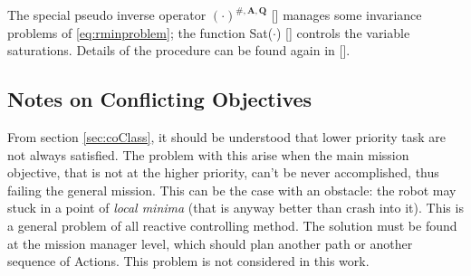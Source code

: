\noindent The special pseudo inverse operator $\boldsymbol{(\cdot)}^{\#,\boldsymbol{A},\boldsymbol{Q}}$ [\cite{IntroMaris1}] manages some invariance problems of \eqref{eq:rminproblem}; the function Sat($\cdot$) [\cite{antoSat}] controls the variable saturations. Details of the procedure can be found again in [\cite{IntroMaris1}].

\subsection{Notes on Conflicting Objectives}
From section \ref{sec:coClass}, it should be understood that lower priority task are not always satisfied. The problem with this arise when the main mission objective, that is not at the higher priority, can't be never accomplished, thus failing the general mission. This can be the case with an obstacle: the robot may stuck in a point of \textit{local minima} (that is anyway better than crash into it). This is a general problem of all reactive controlling method. The solution must be found at the mission manager level, which should plan another path or another sequence of Actions. This problem is not considered in this work. 



